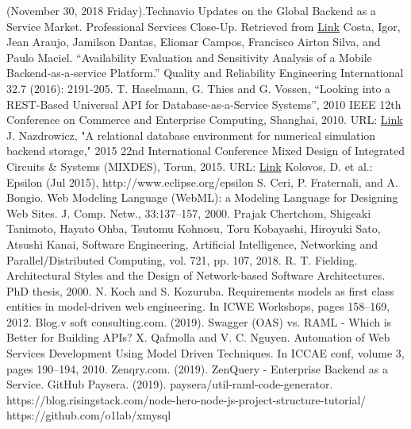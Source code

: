 \documentclass[letterpaper, 10 pt, conference]{ieeeconf}
\begin{document}
\begin{thebibliography}{99}

 (November 30, 2018 Friday).Technavio Updates on the Global Backend as a Service Market. Professional Services Close-Up. Retrieved from \href{https://advance.lexis.com/api/document?collection=news&id=urn:contentItem:5TVM-M141-F06S-P1FM-00000-00&context=1516831}{Link}
 Costa, Igor, Jean Araujo, Jamilson Dantas, Eliomar Campos, Francisco Airton Silva, and Paulo Maciel. 
``Availability Evaluation and Sensitivity Analysis of a Mobile Backend‐as‐a‐service Platform.'' Quality and Reliability Engineering International 32.7 (2016): 2191-205.
 T. Haselmann, G. Thies and G. Vossen, ``Looking into a REST-Based Universal API for Database-as-a-Service Systems'', 2010 IEEE 12th Conference on Commerce and Enterprise Computing, Shanghai, 2010. URL: \href{http://ieeexplore.ieee.org/stamp/stamp.jsp?tp=&arnumber=5708388&isnumber=5708385}{Link}
 J. Nazdrowicz, "A relational database environment for numerical simulation backend storage," 2015 22nd International Conference Mixed Design of Integrated Circuits \& Systems (MIXDES), Torun, 2015. URL: \href{http://ieeexplore.ieee.org/stamp/stamp.jsp?tp=&arnumber=7208595&isnumber=7208464}{Link}
 Kolovos, D. et al.: Epsilon (Jul 2015), http://www.eclipse.org/epsilon
 S. Ceri, P. Fraternali, and A. Bongio. Web Modeling Language (WebML): a Modeling Language for Designing Web Sites. J. Comp. Netw., 33:137–157, 2000.
 Prajak Chertchom, Shigeaki Tanimoto, Hayato Ohba, Tsutomu Kohnosu, Toru Kobayashi, Hiroyuki Sato, Atsushi Kanai, Software Engineering, Artificial Intelligence, Networking and Parallel/Distributed Computing, vol. 721, pp. 107, 2018.
 R. T. Fielding. Architectural Styles and the Design of Network-based Software Architectures. PhD thesis, 2000.
 N. Koch and S. Kozuruba. Requirements models as ﬁrst class entities in model-driven web engineering. In ICWE Workshops, pages 158–169, 2012.
 Blog.v soft consulting.com. (2019). Swagger (OAS) vs. RAML - Which is Better for Building APIs?
 X. Qafmolla and V. C. Nguyen. Automation of Web Services Development Using Model Driven Techniques. In ICCAE conf, volume 3, pages 190–194, 2010.
 Zenqry.com. (2019). ZenQuery - Enterprise Backend as a Service.
 GitHub Paysera. (2019). paysera/util-raml-code-generator.
 https://blog.risingstack.com/node-hero-node-js-project-structure-tutorial/
 https://github.com/o1lab/xmysql

\end{thebibliography}
\end{document}
